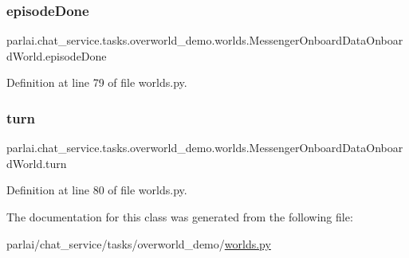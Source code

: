 \subsubsection{\texorpdfstring{episode\+Done}{episodeDone}}
{\footnotesize\ttfamily parlai.\+chat\+\_\+service.\+tasks.\+overworld\+\_\+demo.\+worlds.\+Messenger\+Onboard\+Data\+Onboard\+World.\+episode\+Done}



Definition at line 79 of file worlds.\+py.

\mbox{\label{classparlai_1_1chat__service_1_1tasks_1_1overworld__demo_1_1worlds_1_1MessengerOnboardDataOnboardWorld_a75f4b93eabd0944f540fcfdf3271f8c9}} 
\subsubsection{\texorpdfstring{turn}{turn}}
{\footnotesize\ttfamily parlai.\+chat\+\_\+service.\+tasks.\+overworld\+\_\+demo.\+worlds.\+Messenger\+Onboard\+Data\+Onboard\+World.\+turn}



Definition at line 80 of file worlds.\+py.



The documentation for this class was generated from the following file\+:\begin{DoxyCompactItemize}
\item 
parlai/chat\+\_\+service/tasks/overworld\+\_\+demo/\hyperlink{parlai_2chat__service_2tasks_2overworld__demo_2worlds_8py}{worlds.\+py}\end{DoxyCompactItemize}
